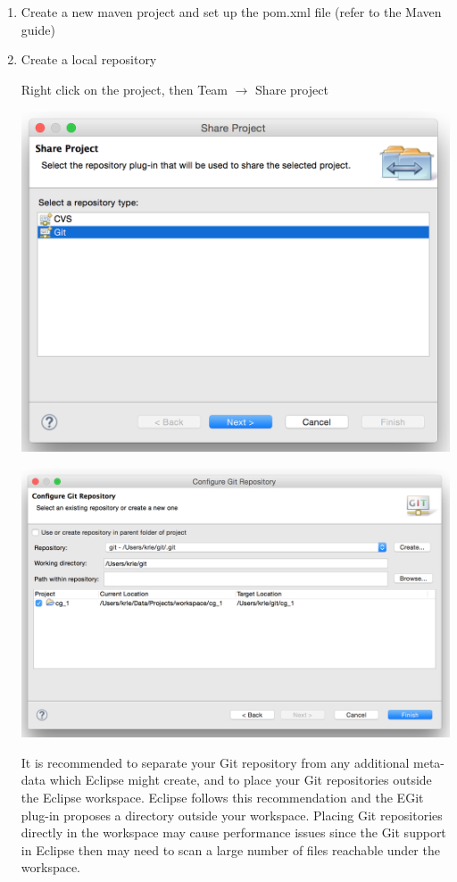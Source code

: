 \documentclass{article}
\begin{document}
\begin{enumerate}
\item Create a new maven project and set up the pom.xml file (refer to the Maven guide)
\item Create a local repository

Right click on the project, then Team $\rightarrow$ Share project

\begin{center}
\includegraphics[scale=0.5]{figures/s4.png}
\end{center}

\begin{center}
\includegraphics[scale=0.5]{figures/s5.png}
\end{center}

It is recommended to separate your Git repository from any additional
meta-data which Eclipse might create, and to place your
Git repositories outside the Eclipse workspace. Eclipse follows this
recommendation and the EGit plug-in proposes a directory outside your
workspace. Placing Git repositories directly in the workspace may
cause performance issues since the Git support in Eclipse then may
need to scan a large number of files reachable under the workspace. 


\end{enumerate}
\end{document}
